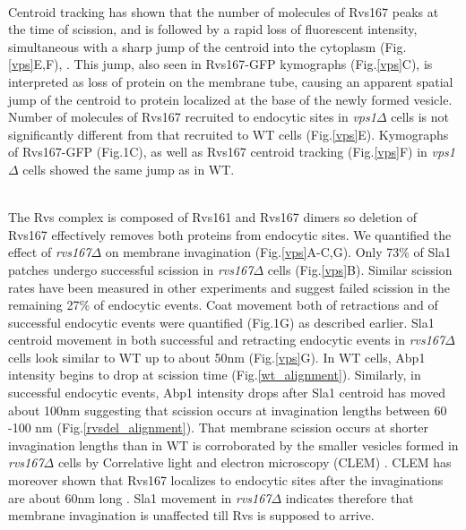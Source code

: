\documentclass[9pt,lineno]{elife}
\begin{document}
~\\
Centroid tracking has shown that the number of molecules of Rvs167 peaks at the time of  scission, and is followed by a rapid loss of fluorescent intensity, simultaneous with a sharp jump of the centroid into the cytoplasm (Fig.\ref{vps}E,F),  \citep{Picco2015}. This jump, also seen in Rvs167-GFP kymographs (Fig.\ref{vps}C), is interpreted as loss of protein on the membrane tube, causing an apparent spatial jump of the centroid to protein localized at the base of the newly formed vesicle. Number of molecules of Rvs167 recruited to endocytic sites in \textit{vps1$\Delta$} cells is not significantly different from that recruited to WT cells (Fig.\ref{vps}E). Kymographs of Rvs167-GFP (Fig.1C), as well as Rvs167  centroid tracking (Fig.\ref{vps}F) in \textit{vps1$\Delta$} cells showed the same jump as in WT. 

~\\
The Rvs complex is composed of Rvs161 and Rvs167 dimers \citep{Boeke2014} so deletion of Rvs167 effectively removes both proteins from endocytic sites. We quantified the effect of \textit{rvs167$\Delta$}  on membrane invagination (Fig.\ref{vps}A-C,G). Only 73\% of Sla1 patches undergo successful scission in \textit{rvs167$\Delta$}  cells (Fig.\ref{vps}B). Similar scission rates have been measured in other experiments \citep{Kaksonen2005} and suggest failed scission in the remaining 27\% of endocytic events. Coat movement both of retractions and of successful endocytic events were quantified (Fig.1G) as described earlier. Sla1 centroid movement in both successful and retracting endocytic events in \textit{rvs167$\Delta$}  cells look similar to WT up to about 50nm (Fig.\ref{vps}G). In WT cells, Abp1 intensity begins to drop at scission time (Fig.\ref{wt_alignment}). Similarly, in successful endocytic events, Abp1 intensity drops after Sla1 centroid has moved about 100nm suggesting that scission occurs at invagination lengths between 60 -100 nm (Fig.\ref{rvsdel_alignment}). That membrane scission occurs at shorter invagination lengths than in WT is corroborated  by the smaller vesicles formed in \textit{rvs167$\Delta$}  cells by Correlative light and electron microscopy (CLEM) \citep{Kukulski2012}. CLEM has moreover shown that Rvs167 localizes to endocytic sites after the invaginations are about 60nm long \citep{Kukulski2012}. Sla1 movement in \textit{rvs167$\Delta$} indicates therefore that membrane invagination is unaffected till Rvs is supposed to arrive. 


\end{document}
